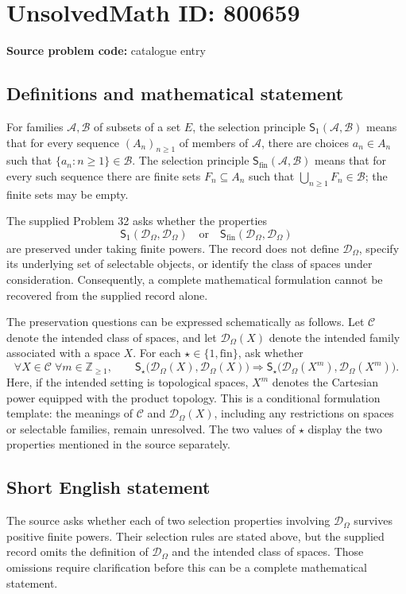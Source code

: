 \documentclass[11pt]{article}
\begin{document}
\section*{UnsolvedMath ID: 800659}
\textbf{Source problem code:} catalogue entry
\subsection{Definitions and mathematical statement}
For families \(\mathcal A,\mathcal B\) of subsets of a set \(E\), the selection principle \(\mathsf S_1(\mathcal A,\mathcal B)\) means that for every sequence \((A_n)_{n\geq 1}\) of members of \(\mathcal A\), there are choices \(a_n\in A_n\) such that \(\{a_n:n\geq 1\}\in\mathcal B\). The selection principle \(\mathsf S_{\mathrm{fin}}(\mathcal A,\mathcal B)\) means that for every such sequence there are finite sets \(F_n\subseteq A_n\) such that \(\bigcup_{n\geq 1}F_n\in\mathcal B\); the finite sets may be empty.

The supplied Problem 32 asks whether the properties
\[
\mathsf S_1(\mathcal D_\Omega,\mathcal D_\Omega)
\quad\text{or}\quad
\mathsf S_{\mathrm{fin}}(\mathcal D_\Omega,\mathcal D_\Omega)
\]
are preserved under taking finite powers. The record does not define \(\mathcal D_\Omega\), specify its underlying set of selectable objects, or identify the class of spaces under consideration. Consequently, a complete mathematical formulation cannot be recovered from the supplied record alone.

The preservation questions can be expressed schematically as follows. Let \(\mathscr C\) denote the intended class of spaces, and let \(\mathcal D_\Omega(X)\) denote the intended family associated with a space \(X\). For each \(\star\in\{1,\mathrm{fin}\}\), ask whether
\[
\forall X\in\mathscr C\;\forall m\in\mathbb Z_{\geq 1},\qquad
\mathsf S_\star\bigl(\mathcal D_\Omega(X),\mathcal D_\Omega(X)\bigr)
\Longrightarrow
\mathsf S_\star\bigl(\mathcal D_\Omega(X^m),\mathcal D_\Omega(X^m)\bigr).
\]
Here, if the intended setting is topological spaces, \(X^m\) denotes the Cartesian power equipped with the product topology. This is a conditional formulation template: the meanings of \(\mathscr C\) and \(\mathcal D_\Omega(X)\), including any restrictions on spaces or selectable families, remain unresolved. The two values of \(\star\) display the two properties mentioned in the source separately.
\subsection{Short English statement}
The source asks whether each of two selection properties involving \(\mathcal D_\Omega\) survives positive finite powers. Their selection rules are stated above, but the supplied record omits the definition of \(\mathcal D_\Omega\) and the intended class of spaces. Those omissions require clarification before this can be a complete mathematical statement.
\end{document}

